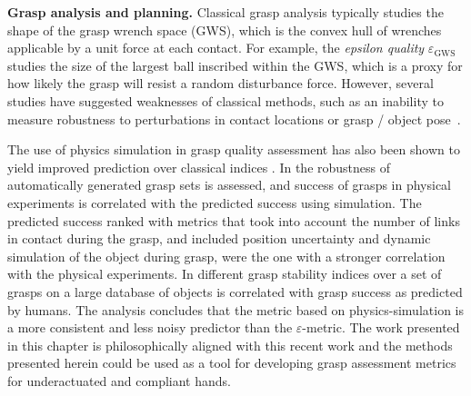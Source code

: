 
{\bf Grasp analysis and planning.}  
Classical grasp analysis typically studies the shape of the grasp wrench space (GWS), which is the convex hull of wrenches applicable by a unit force at each contact. For example, the {\emph{epsilon quality} $\varepsilon_{\text{GWS}}$} \cite{Ferrari92, Pokorny13c} studies the size of the largest ball inscribed within the GWS, which is a proxy for how likely the grasp will resist a random  disturbance force. 
However, several studies have suggested weaknesses of classical methods, such as an inability to measure robustness to perturbations in contact locations or grasp / object pose~\cite{Weisz12}. 

The use of physics simulation in grasp quality assessment has also been shown to yield improved prediction over classical indices \cite{Kappler15,JunggonKim13}.  In \cite{JunggonKim13} the robustness of automatically generated grasp sets is assessed, and success of grasps in physical experiments is correlated with the predicted success using simulation. The predicted success ranked with metrics that took into account the number of links in contact during the grasp, and included position uncertainty and dynamic simulation of the object during grasp, were the one with a stronger correlation with the physical experiments.
In \cite{Kappler15} different grasp stability indices over a set of grasps on a large database of objects is correlated with grasp success as predicted by humans. The analysis concludes that the metric based on  physics-simulation is a more consistent and less noisy predictor than the $\varepsilon$-metric.
The work presented in this chapter is philosophically aligned with this recent work and the methods presented herein could be used as a tool for developing grasp assessment metrics for underactuated and compliant hands.

